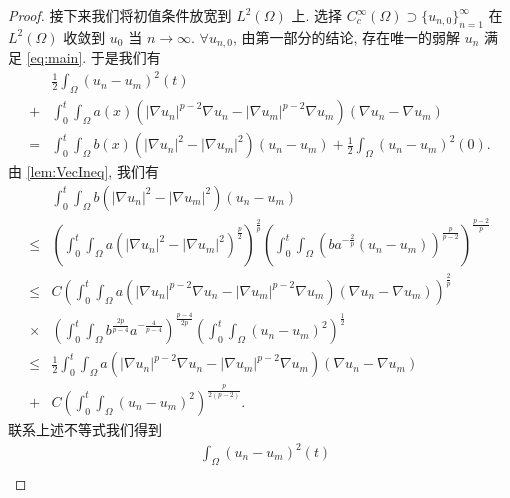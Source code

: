 \documentclass[twoside,longtitle]{LZUthesis}
\theoremstyle{definition}
\numberwithin{equation}{chapter}
\newcommand*\abs[1]{\lvert#1\rvert}
\newcommand*\Brace[1]{\lbrace#1\rbrace}
\begin{document}
\begin{proof}
	接下来我们将初值条件放宽到 $L^2(\Omega)$ 上.
	选择 $C_c^{\infty}(\Omega) \supset \Brace{u_{n, 0}}_{n=1}^{\infty} $
	在 $L^2(\Omega) $ 收敛到 $u_0$ 当 $n \to \infty $. $\forall u_{n, 0}$,
	由第一部分的结论, 存在唯一的弱解 $u_n$ 满足 \cref{eq:main}.
	于是我们有
	\begin{equation}
		\begin{split}
			& \frac{1}{2}\int_{\Omega}\left(u_n-u_m\right)^2(t)\\
			+{} & \int_{0}^{t}\int_{\Omega}a(x)
			\left(\abs{\nabla u_n}^{p-2}\nabla u_n
			- \abs{\nabla u_m}^{p-2}\nabla u_m\right)
			\left(\nabla u_n - \nabla u_m\right)\\
			={} & \int_{0}^{t}\int_{\Omega}b(x)\left(\abs{\nabla u_n}^2
			- \abs{\nabla u_m}^2\right)\left(u_n - u_m\right)
			+ \frac{1}{2}\int_{\Omega}\left(u_n-u_m\right)^2(0).
		\end{split}
	\end{equation}
	由 \cref{lem:VecIneq}, 我们有
	\begin{equation}
		\begin{split}
			& \int_{0}^{t}\int_{\Omega}b\left(\abs{\nabla u_n}^2
			- \abs{\nabla u_m}^2\right)\left(u_n - u_m\right)\\
			\leq{} & \left(\int_0^t\int_{\Omega}a\left(\abs{\nabla u_n}^2
			- \abs{\nabla u_m}^2\right)^{\frac{p}{2}}\right)^{\frac{2}{p}}
			\left(\int_0^t\int_{\Omega}\left(ba^{-\frac{2}{p}}
			\left(u_n-u_m\right)\right)^{\frac{p}{p-2}}\right)^{\frac{p-2}{p}}\\
			\leq{} & C\left(\int_0^t\int_{\Omega}a
			\left(\abs{\nabla u_n}^{p-2}\nabla u_n
			- \abs{\nabla u_m}^{p-2}\nabla u_m\right)
			\left(\nabla u_n - \nabla u_m\right)\right)^{\frac{2}{p}}\\
			\times{} & \left(\int_0^t\int_{\Omega}b^{\frac{2p}{p-4}}a^{-\frac{4}{p-4}}\right)^{\frac{p-4}{2p}}
			\left(\int_0^t\int_{\Omega}\left(u_n-u_m\right)^2\right)^{\frac{1}{2}}\\
			\leq{} & \frac{1}{2}\int_0^t\int_{\Omega}a
			\left(\abs{\nabla u_n}^{p-2}\nabla u_n
			- \abs{\nabla u_m}^{p-2}\nabla u_m\right)
			\left(\nabla u_n - \nabla u_m\right)\\
			+{} & C\left(\int_0^t\int_{\Omega}\left(u_n-u_m\right)^2\right)^{\frac{p}{2(p-2)}}.
		\end{split}
	\end{equation}
	联系上述不等式我们得到
	\begin{equation}\label{un-umL2_0TW1p_bd_0TL2_L20}
		\begin{split}
			& \int_{\Omega}\left(u_n-u_m\right)^2(t)\\

\end{split}
\end{equation}
\end{proof}
\end{document}
